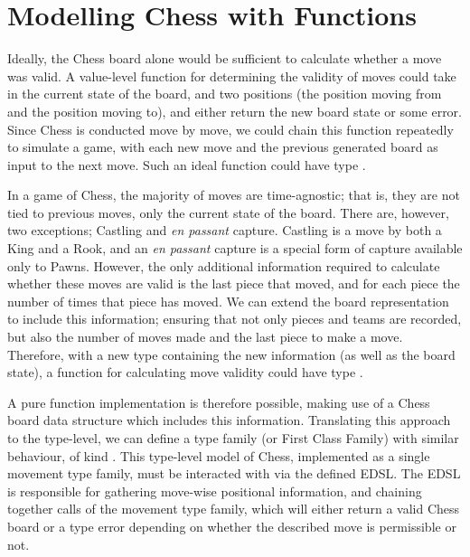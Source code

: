 \section{Modelling Chess with Functions} \label{chesswithfunctions}

Ideally, the Chess board alone would be sufficient to calculate whether a move was valid. A value-level function for determining the validity of moves could take in the current state of the board, and two positions (the position moving from and the position moving to), and either return the new board state or some error. Since Chess is conducted move by move, we could chain this function repeatedly to simulate a game, with each new move and the previous generated board as input to the next move. Such an ideal function could have type .

In a game of Chess, the majority of moves are time-agnostic; that is, they are not tied to previous moves, only the current state of the board. There are, however, two exceptions; Castling and \emph{en passant} capture. Castling is a move by both a King and a Rook, and an \emph{en passant} capture is a special form of capture available only to Pawns. However, the only additional information required to calculate whether these moves are valid is the last piece that moved, and for each piece the number of times that piece has moved. We can extend the board representation to include this information; ensuring that not only pieces and teams are recorded, but also the number of moves made and the last piece to make a move. Therefore, with a new type  containing the new information (as well as the board state), a function for calculating move validity could have type .

A pure function implementation is therefore possible, making use of a Chess board data structure which includes this information. Translating this approach to the type-level, we can define a type family (or First Class Family) with similar behaviour, of kind . This type-level model of Chess, implemented as a single movement type family, must be interacted with via the defined EDSL. The EDSL is responsible for gathering move-wise positional information, and chaining together calls of the movement type family, which will either return a valid Chess board or a type error depending on whether the described move is permissible or not.


